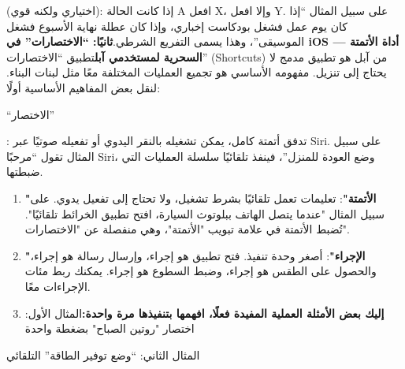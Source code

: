 


(اختياري ولكنه قوي): إذا كانت الحالة A افعل X، وإلا افعل Y. على سبيل المثال “إذا كان يوم عمل فشغل بودكاست إخباري، وإذا كان عطلة نهاية الأسبوع فشغل الموسيقى”، وهذا يسمى التفريع الشرطي.\textbf{ثانيًا: “الاختصارات” في iOS — أداة الأتمتة السحرية لمستخدمي آبل}تطبيق “الاختصارات” (Shortcuts) من آبل هو تطبيق مدمج لا يحتاج إلى تنزيل. مفهومه الأساسي هو تجميع العمليات المختلفة معًا مثل لبنات البناء. لنقل بعض المفاهيم الأساسية أولًا:

“الاختصار”

: تدفق أتمتة كامل، يمكن تشغيله بالنقر اليدوي أو تفعيله صوتيًا عبر Siri. على سبيل المثال تقول “مرحبًا Siri، وضع العودة للمنزل”، فينفذ تلقائيًا سلسلة العمليات التي ضبطتها.

\begin{enumerate}
  \item \textbf{"الأتمتة"}: تعليمات تعمل تلقائيًا بشرط تشغيل، ولا تحتاج إلى تفعيل يدوي. على سبيل المثال "عندما يتصل الهاتف ببلوتوث السيارة، افتح تطبيق الخرائط تلقائيًا". تُضبط الأتمتة في علامة تبويب "الأتمتة"، وهي منفصلة عن "الاختصارات".
  \item \textbf{"الإجراء"}: أصغر وحدة تنفيذ. فتح تطبيق هو إجراء، وإرسال رسالة هو إجراء، والحصول على الطقس هو إجراء، وضبط السطوع هو إجراء. يمكنك ربط مئات الإجراءات معًا.
  \item \textbf{إليك بعض الأمثلة العملية المفيدة فعلًا، افهمها بتنفيذها مرة واحدة:}المثال الأول: اختصار "روتين الصباح" بضغطة واحدة
\end{enumerate}


المثال الثاني: “وضع توفير الطاقة” التلقائي

